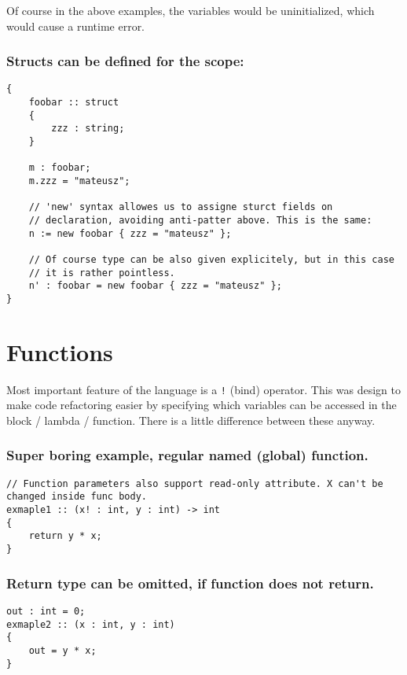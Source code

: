 \documentclass[11pt]{article}
\begin{document}
Of course in the above examples, the variables would be uninitialized, which
would cause a runtime error.

\subsubsection*{Structs can be defined for the scope:}
\label{sec:orgdae7afd}
\begin{verbatim}
{
    foobar :: struct
    {
        zzz : string;
    }

    m : foobar;
    m.zzz = "mateusz";

    // 'new' syntax allowes us to assigne sturct fields on
    // declaration, avoiding anti-patter above. This is the same:
    n := new foobar { zzz = "mateusz" };

    // Of course type can be also given explicitely, but in this case
    // it is rather pointless.
    n' : foobar = new foobar { zzz = "mateusz" };
}
\end{verbatim}

\section*{Functions}
\label{sec:orgf4cc570}

Most important feature of the language is a \texttt{!} (bind) operator. This was design
to make code refactoring easier by specifying which variables can be accessed in
the block / lambda / function. There is a little difference between these
anyway.

\subsubsection*{Super boring example, regular named (global) function.}
\label{sec:org0ddccd8}
\begin{verbatim}
// Function parameters also support read-only attribute. X can't be changed inside func body.
exmaple1 :: (x! : int, y : int) -> int
{
    return y * x;
}
\end{verbatim}

\subsubsection*{Return type can be omitted, if function does not return.}
\label{sec:orgc5f864e}
\begin{verbatim}
out : int = 0;
exmaple2 :: (x : int, y : int)
{
    out = y * x;
}
\end{verbatim}
\end{document}
